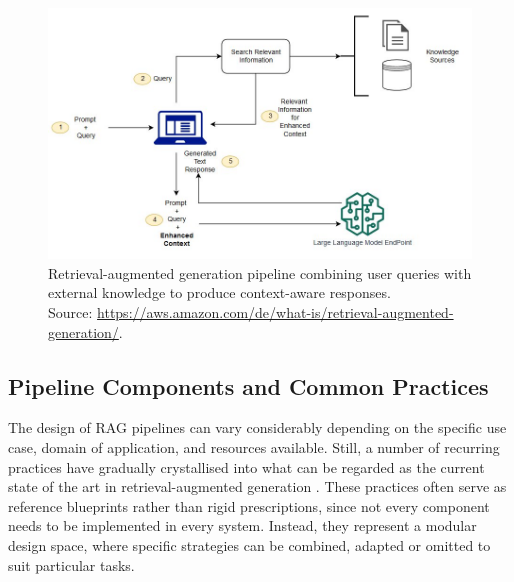 \begin{spacing}{1.5}
\begin{figure}[H]
  \centering
  \includegraphics[width=\textwidth]{images/rag_workflow.jpg} 
  \caption{Retrieval-augmented generation pipeline combining user queries with external knowledge to produce context-aware responses.\\
  \footnotesize{Source: \url{https://aws.amazon.com/de/what-is/retrieval-augmented-generation/}.\nocite{noauthor_was_nodate}}}
  \label{fig:rag}
\end{figure}

\subsection{Pipeline Components and Common Practices}
The design of RAG pipelines can vary considerably depending on the specific use case, domain of application, and resources available. Still, a number of recurring practices have gradually crystallised into what can be regarded as the current state of the art in retrieval-augmented generation \citep{vaibhav_retrieval-augmented_2025,wang_searching_2024,arslan_survey_2024,gao_retrieval-augmented_2024,gupta_comprehensive_2024}. These practices often serve as reference blueprints rather than rigid prescriptions, since not every component needs to be implemented in every system. Instead, they represent a modular design space, where specific strategies can be combined, adapted or omitted to suit particular tasks.


\end{spacing}
